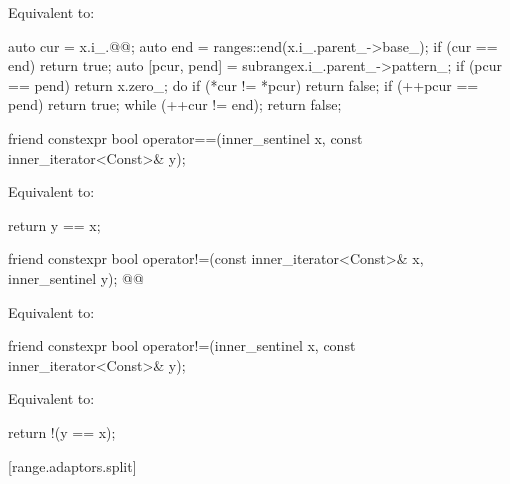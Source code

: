 \begin{itemdescr}
\pnum
\effects Equivalent to:
\begin{codeblock}
auto cur = x.i_.@\oldtxt{()}@;
auto end = ranges::end(x.i_.parent_->base_);
if (cur == end) return true;
auto [pcur, pend] = subrange{x.i_.parent_->pattern_};
if (pcur == pend) return x.zero_;
do {
  if (*cur != *pcur) return false;
  if (++pcur == pend) return true;
} while (++cur != end);
return false;
\end{codeblock}
\end{itemdescr}

{\color{oldclr}
%
\begin{itemdecl}
friend constexpr bool operator==(inner_sentinel x, const inner_iterator<Const>& y);
\end{itemdecl}

\begin{itemdescr}
\pnum
\effects Equivalent to:
\begin{codeblock}
return y == x;
\end{codeblock}
\end{itemdescr}
} %

%
\begin{itemdecl}
friend constexpr bool operator!=(const inner_iterator<Const>& x, inner_sentinel y);
@@
\end{itemdecl}

\begin{itemdescr}
\pnum
\effects Equivalent to: 
\end{itemdescr}

{\color{oldclr}
%
\begin{itemdecl}
friend constexpr bool operator!=(inner_sentinel x, const inner_iterator<Const>& y);
\end{itemdecl}

\begin{itemdescr}
\pnum
\effects Equivalent to:
\begin{codeblock}
return !(y == x);
\end{codeblock}
\end{itemdescr}
} %

[range.adaptors.split]{}


